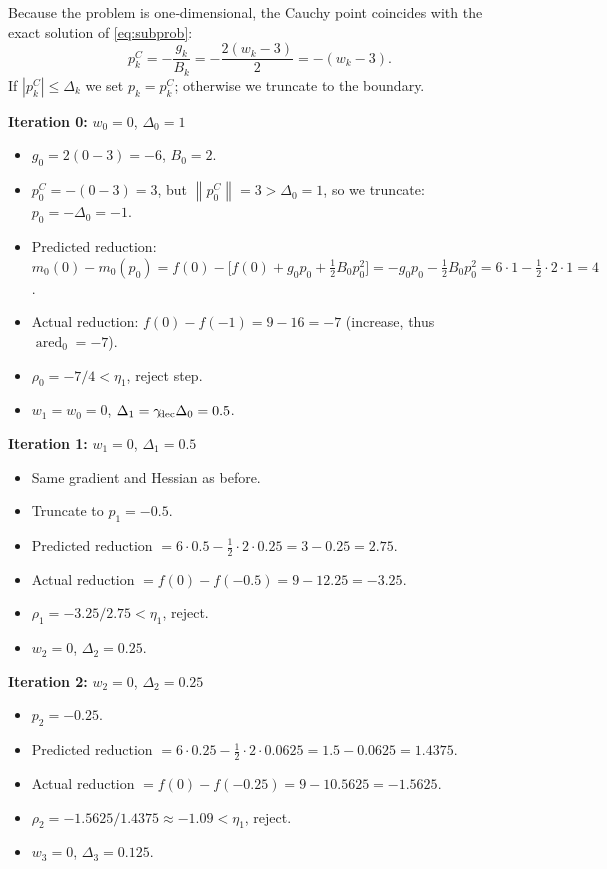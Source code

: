 \documentclass{article}
\newcommand{\norm}[1]{\left\lVert #1\right\rVert}
\begin{document}
Because the problem is one‑dimensional, the Cauchy point coincides with the exact solution of \eqref{eq:subprob}:
\[
p^{C}_{k}= -\frac{g_{k}}{B_{k}}=
-\frac{2(w_{k}-3)}{2}=-(w_{k}-3).
\]
If $|p^{C}_{k}|\le\Delta_{k}$ we set $p_{k}=p^{C}_{k}$; otherwise we truncate to the boundary.

\medskip
\noindent\textbf{Iteration 0:} $w_{0}=0$, $\Delta_{0}=1$  

\begin{itemize}
\item $g_{0}=2(0-3)=-6$, $B_{0}=2$.
\item $p^{C}_{0}=-(0-3)=3$, but $\norm{p^{C}_{0}}=3>\Delta_{0}=1$, so we truncate:
      $p_{0}=-\Delta_{0}=-1$.
\item Predicted reduction:
      $m_{0}(0)-m_{0}(p_{0})=f(0)-\bigl[f(0)+g_{0}p_{0}+\tfrac12 B_{0}p_{0}^{2}\bigr]
      =-g_{0}p_{0}-\tfrac12 B_{0}p_{0}^{2}=6\cdot1-\tfrac12\cdot2\cdot1=4$.
\item Actual reduction:
      $f(0)-f(-1)=9-16= -7$ (increase, thus $\operatorname{ared}_{0}=-7$).
\item $\rho_{0}= -7/4<\eta_{1}$, reject step.
\item $w_{1}=w_{0}=0$, $\Delta_{1}= \gamma_{\!{\rm dec}}\Delta_{0}=0.5$.
\end{itemize}

\medskip
\noindent\textbf{Iteration 1:} $w_{1}=0$, $\Delta_{1}=0.5$

\begin{itemize}
\item Same gradient and Hessian as before.
\item Truncate to $p_{1}=-0.5$.
\item Predicted reduction $=6\cdot0.5-\tfrac12\cdot2\cdot0.25=3-0.25=2.75$.
\item Actual reduction $=f(0)-f(-0.5)=9-12.25=-3.25$.
\item $\rho_{1}= -3.25/2.75<\eta_{1}$, reject.
\item $w_{2}=0$, $\Delta_{2}=0.25$.
\end{itemize}

\medskip
\noindent\textbf{Iteration 2:} $w_{2}=0$, $\Delta_{2}=0.25$

\begin{itemize}
\item $p_{2}=-0.25$.
\item Predicted reduction $=6\cdot0.25-\tfrac12\cdot2\cdot0.0625=1.5-0.0625=1.4375$.
\item Actual reduction $=f(0)-f(-0.25)=9-10.5625=-1.5625$.
\item $\rho_{2}= -1.5625/1.4375\approx -1.09<\eta_{1}$, reject.
\item $w_{3}=0$, $\Delta_{3}=0.125$.
\end{itemize}
\end{document}
